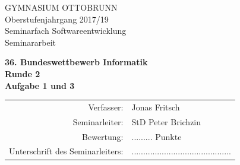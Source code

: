 \documentclass[a4paper,12pt]{article}			%
\begin{document}
\parindent0cm 							%


\thispagestyle{empty}

\begin{center} 							%

\begin{large} 
GYMNASIUM OTTOBRUNN	\\
\vspace{1cm}
Oberstufenjahrgang 2017/19\\
\vspace{1cm}
Seminarfach Softwareentwicklung\\
\vspace{2cm}
Seminararbeit\\
\end{large}

\vspace{1cm}

\begin{Huge}							%
\textbf{36. Bundeswettbewerb Informatik \\ \vspace{0.8cm}
Runde 2 \\ \vspace{0.8cm}
Aufgabe 1 und 3}\vspace{2cm}
\end{Huge}
	


\begin{large}							%
\begin{tabular}{rl}						%
Verfasser:& Jonas Fritsch \\			%
Seminarleiter: & StD Peter Brichzin \\
Bewertung:  & ......... Punkte  \\
Unterschrift des Seminarleiters: & ...........................................  \\
\end{tabular} 
\end{large}

\end{center}							%
\end{document}
